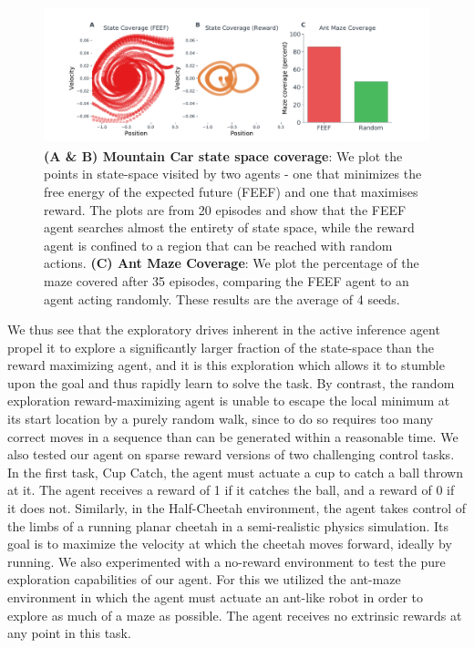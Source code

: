 \begin{figure}[h]
   \centering 
   \includegraphics[width=12cm, height=4cm]{chapter_4_figures/RLAI_figure_two.pdf}
\caption{\textbf{(A \& B) Mountain Car state space coverage}: We plot the points in state-space visited by two agents - one that minimizes the free energy of the expected future (FEEF) and one that maximises reward. The plots are from 20 episodes and show that the FEEF agent searches almost the entirety of state space, while the reward agent is confined to a region that can be reached with random actions. \textbf{(C) Ant Maze Coverage}: We plot the percentage of the maze covered after 35 episodes, comparing the FEEF agent to an agent acting randomly. These results are the average of 4 seeds.}
\end{figure}


We thus see that the exploratory drives inherent in the active inference agent propel it to explore a significantly larger fraction of the state-space than the reward maximizing agent, and it is this exploration which allows it to stumble upon the goal and thus rapidly learn to solve the task. By contrast, the random exploration reward-maximizing agent is unable to escape the local minimum at its start location by a purely random walk, since to do so requires too many correct moves in a sequence than can be generated within a reasonable time.
We also tested our agent on sparse reward versions of two challenging control tasks. In the first task, Cup Catch, the agent must actuate a cup to catch a ball thrown at it. The agent receives a reward of 1 if it catches the ball, and a reward of 0 if it does not. Similarly, in the Half-Cheetah environment, the agent takes control of the limbs of a running planar cheetah in a semi-realistic physics simulation. Its goal is to maximize the velocity at which the cheetah moves forward, ideally by running. We also experimented with a no-reward environment to test the pure exploration capabilities of our agent. For this we utilized the ant-maze environment in which the agent must actuate an ant-like robot in order to explore as much of a maze as possible. The agent receives no extrinsic rewards at any point in this task.

